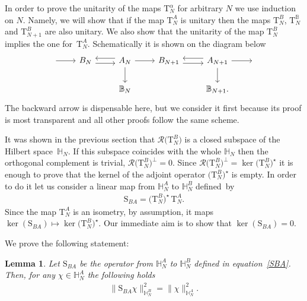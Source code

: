 \documentclass[11pt]{article}
\numberwithin{equation}{section}
\numberwithin{equation}{section}
\newtheorem{Lemma}[Theorem]{Lemma}
\begin{document}
In order to prove the unitarity of the maps $\mathrm T^\alpha_N$ for arbitrary $N$ we use induction on $N$. Namely, we will show
that if the map $\mathrm T_N^{A}$ is unitary %
then the maps $\mathrm T_N^B$, $\mathrm T_N^{\mathbb B}$ and $\mathrm T_{N+1}^B$ are also unitary. We also show that the unitarity of the
map $\mathrm T_{N}^B$ implies the one for~$\mathrm T_{N}^A$. Schematically it is shown on the diagram below
\begin{equation*}%
\begin{tikzcd}
\arrow[r] &B_N\arrow[r, yshift=-0.7ex]
&\arrow[l, yshift=0.7ex] A_N \arrow[r] \arrow[d] & B_{N+1}\arrow[r, yshift=-0.7ex] &
\arrow[l, yshift=0.7ex] A_{N+1} \arrow[d] \arrow[r] &{}
\\
&&\mathbb{B}_N && \mathbb{B}_{N+1}.
\end{tikzcd}
\end{equation*}
The backward arrow is dispensable here, but we consider it first because its proof is most transparent and all other proofs follow the same
scheme.

{\sloppy
It was shown in
the previous section that $\mathcal R\big(\mathrm T_N^B\big)$
is a closed subspace of the Hilbert space~$\mathbb H_N$. If this subspace coincides with the whole $\mathbb H_N$ then the orthogonal
complement is trivial, $\mathcal R\big(\mathrm T_N^B \big)^\perp=0$. Since $\mathcal R\big(\mathrm T_N^B \big)^\perp=\ker \big(\mathrm T_N^B\big)^\star$ it is
enough to prove that the kernel of the adjoint operator $\big(\mathrm T_N^B\big)^\star$ is empty. In order to do it let us consider a linear map
from $\mathbb H_N^A$ to $\mathbb H_N^B$ defined~by
\begin{gather}\label{SBA}
\mathrm S_{BA}=\big(\mathrm T_N^B\big)^\star\,\mathrm T_N^A.
\end{gather}
Since the map $\mathrm T_N^A$ is an isometry, by assumption, it maps $ \ker(\mathrm S_{BA})\mapsto \ker \big(\mathrm T_N^B\big)^\star$. Our
immediate aim is to show that $ \ker(\mathrm S_{BA})=0$.}

We prove the following statement:

\begin{Lemma}\label{lemma:SBA}
Let $\mathrm S_{BA}$ be the operator from $\mathbb H_{N}^A$ to $\mathbb H_N^B$ defined in equation~\eqref{SBA}. Then, for any $\chi\in \mathbb
H_{N}^A$ the following holds
\begin{gather}\label{id-SBA}
\|\mathrm S_{BA}\chi\|^2_{\mathbb H_N^B}=\|\chi\|^2_{\mathbb H_N^A}.
\end{gather}
\end{Lemma}
%
\end{document}
